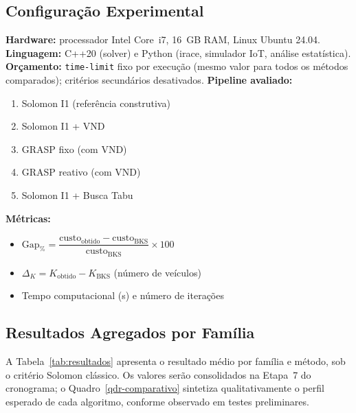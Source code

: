 \documentclass[10pt, a4paper]{article}
\begin{document}
\subsection{Configura\c{c}\~ao Experimental}

\textbf{Hardware:} processador Intel Core~i7, 16~GB RAM, Linux Ubuntu 24.04. \textbf{Linguagem:} C++20 (solver) e Python (irace, simulador IoT, an\'alise estat\'istica). \textbf{Or\c{c}amento:} \texttt{time-limit} fixo por execu\c{c}\~ao (mesmo valor para todos os m\'etodos comparados); crit\'erios secund\'arios desativados. \textbf{Pipeline avaliado:}
\begin{enumerate}
\item Solomon I1 (refer\^encia construtiva)
\item Solomon I1 + VND
\item GRASP fixo (com VND)
\item GRASP reativo (com VND)
\item Solomon I1 + Busca Tabu
\end{enumerate}

\textbf{M\'etricas:}
\begin{itemize}
\item $\text{Gap}_\% = \dfrac{\text{custo}_\text{obtido} - \text{custo}_\text{BKS}}{\text{custo}_\text{BKS}} \times 100$
\item $\Delta_K = K_\text{obtido} - K_\text{BKS}$ (n\'umero de ve\'iculos)
\item Tempo computacional (s) e n\'umero de itera\c{c}\~oes
\end{itemize}

\subsection{Resultados Agregados por Fam\'ilia}

A Tabela~\ref{tab:resultados} apresenta o resultado m\'edio por fam\'ilia e m\'etodo, sob o crit\'erio Solomon cl\'assico. Os valores ser\~ao consolidados na Etapa~7 do cronograma; o Quadro~\ref{qdr-comparativo} sintetiza qualitativamente o perfil esperado de cada algoritmo, conforme observado em testes preliminares.
\end{document}
